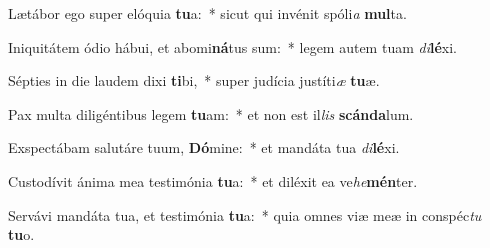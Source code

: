 \item Lætábor ego super elóquia \textbf{tu}a:~* sicut qui invénit spóli\textit{a} \textbf{mul}ta.
\item Iniquitátem ódio hábui, et abomi\textbf{ná}tus sum:~* legem autem tuam \textit{di}\textbf{lé}xi.
\item Sépties in die laudem dixi \textbf{ti}bi,~* super judícia justíti\textit{æ} \textbf{tu}æ.
\item Pax multa diligéntibus legem \textbf{tu}am:~* et non est il\textit{lis} \textbf{scán}\textbf{da}lum.
\item Exspectábam salutáre tuum, \textbf{Dó}mine:~* et mandáta tua \textit{di}\textbf{lé}xi.
\item Custodívit ánima mea testimónia \textbf{tu}a:~* et diléxit ea ve\textit{he}\textbf{mén}ter.
\item Servávi mandáta tua, et testimónia \textbf{tu}a:~* quia omnes viæ meæ in conspéc\textit{tu} \textbf{tu}o.
